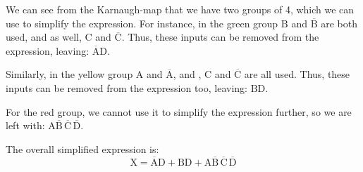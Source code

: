 \documentclass[a4paper]{article}
\begin{document}
\begin{centering}


\begin{karnaugh-map}[4][4][1][$AB$][$CD$]
\end{karnaugh-map}

\end{centering}
We can see from the Karnaugh-map that we have two groups of 4, which we can use to simplify the expression. For instance, in the green group $\mathrm{B}$ and $\mathrm{\overline{B}}$ are both used, and as well, $\mathrm{C}$ and $\mathrm{\overline{C}}$. Thus, these inputs can be removed from the expression, leaving: $\mathrm{\overline{A}D}$.

Similarly, in the yellow group $\mathrm{A}$ and $\mathrm{\overline{A}}$, and , $\mathrm{C}$ and $\mathrm{\overline{C}}$ are all used. Thus, these inputs can be removed from the expression too, leaving: $\mathrm{BD}$.

For the red group, we cannot use it to simplify the expression further, so we are left with: $\mathrm{A\overline{B}\,\overline{C}\,\overline{D}}$.	

The overall simplified expression is: $$\mathrm{X = \overline{A}D + BD + A\overline{B}\,\overline{C}\,\overline{D}}$$
\end{document}

